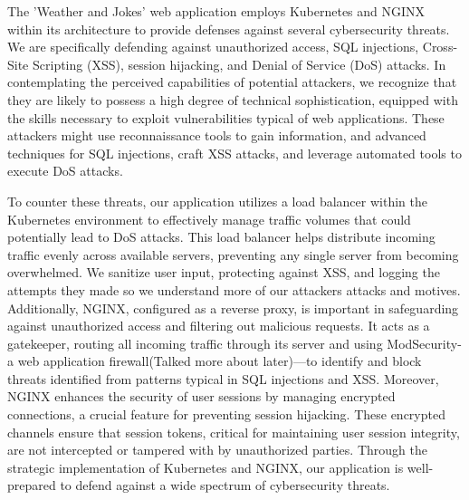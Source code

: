 The 'Weather and Jokes' web application employs Kubernetes and NGINX within its architecture to provide defenses against several cybersecurity threats. 
We are specifically defending against unauthorized access, SQL injections, Cross-Site Scripting (XSS), session hijacking, and Denial of Service (DoS) attacks. 
In contemplating the perceived capabilities of potential attackers, we recognize that they are likely to possess a high degree of technical sophistication, equipped with the skills necessary to exploit vulnerabilities typical of web applications. 
These attackers might use reconnaissance tools to gain information, and advanced techniques for SQL injections, craft XSS attacks, and leverage automated tools to execute DoS attacks.

To counter these threats, our application utilizes a load balancer within the Kubernetes environment to effectively manage traffic volumes that could potentially lead to DoS attacks. 
This load balancer helps distribute incoming traffic evenly across available servers, preventing any single server from becoming overwhelmed. We sanitize user input, protecting against XSS, and logging the attempts they made so we understand more of our attackers attacks and motives.
Additionally, NGINX, configured as a reverse proxy, is important in safeguarding against unauthorized access and filtering out malicious requests. It acts as a gatekeeper, routing all incoming traffic through its server and using ModSecurity-a web application firewall(Talked more about later)—to identify and block threats identified from patterns typical in SQL injections and XSS. 
Moreover, NGINX enhances the security of user sessions by managing encrypted connections, a crucial feature for preventing session hijacking. 
These encrypted channels ensure that session tokens, critical for maintaining user session integrity, are not intercepted or tampered with by unauthorized parties.
Through the strategic implementation of Kubernetes and NGINX, our application is well-prepared to defend against a wide spectrum of cybersecurity threats.
